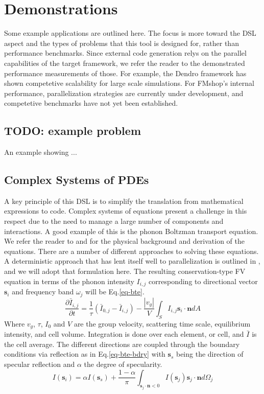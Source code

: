 \documentclass[twoside,leqno,twocolumn]{article}
\begin{document}
\section{Demonstrations}
Some example applications are outlined here. The focus is more toward the DSL aspect and the types of problems that this tool is designed for, rather than performance benchmarks. Since external code generation relys on the parallel capabilities of the target framework, we refer the reader to the demonstrated performance measurements of those. For example, the Dendro framework has shown competetive scalability for large scale simulations\cite{dendro}\cite{dendro2}. For FMshop's internal performance, parallelization strategies are currently under development, and competetive benchmarks have not yet been established.

\subsection{TODO: example problem}
An example showing ...

\subsection{Complex Systems of PDEs}
A key principle of this DSL is to simplify the translation from mathematical expressions to code. Complex systems of equations present a challenge in this respect due to the need to manage a large number of components and interactions. A good example of this is the phonon Boltzman transport equation. We refer the reader to \cite{bte2} and \cite{bte3} for the physical background and derivation of the equations. There are a number of different approaches to solving these equations. A deterministic approach that has lent itself well to parallelization is outlined in \cite{bte}, and we will adopt that formulation here. The resulting conservation-type FV equation in terms of the phonon intensity $I_{i,j}$ corresponding to directional vector $\textbf{s}_{i}$ and frequency band $\omega_{j}$ will be Eq.\ref{eq-bte}.
\begin{equation}
\label{eq-bte}
\frac{\partial \bar{I}_{i,j}}{\partial t} = \frac{1}{\tau}(\bar{I}_{0,j} - \bar{I}_{i,j}) - \frac{|v_{g}|}{V} \int_{S} I_{i,j} \textbf{s}_{i}\cdot \textbf{n} dA
\end{equation}
Where $v_{g}$, $\tau$, $I_0$ and $V$ are the group velocity, scattering time scale, equilibrium intensity, and cell volume. Integration is done over each element, or cell, and $\bar{I}$ is the cell average. The different directions are coupled through the boundary conditions via reflection as in Eq.\ref{eq-bte-bdry} with $\textbf{s}_{s}$ being the direction of specular reflection and $\alpha$ the degree of specularity.
\begin{equation}
\label{eq-bte-bdry}
I(\textbf{s}_{i}) = \alpha I(\textbf{s}_{s}) + \frac{1-\alpha}{\pi}\int_{\textbf{s}_{j}\cdot\textbf{n}<0} I(\textbf{s}_{j}) \textbf{s}_{j}\cdot\textbf{n} d\Omega_{j}
\end{equation}
\end{document}
